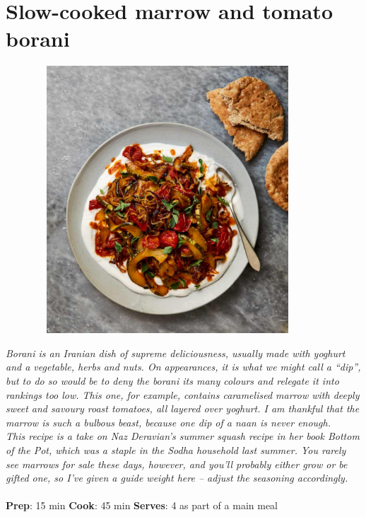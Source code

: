 \documentclass{book}
\begin{document}
\section{Slow-cooked marrow and tomato borani}
\begin{figure}
\centering\includegraphics[width=10cm,height=10cm,keepaspectratio]{Recipe_Pictures/Slow-cooked_marrow_and_tomato_borani.png}
\end{figure}
\emph{Borani is an Iranian dish of supreme deliciousness, usually made with yoghurt and a vegetable, herbs and nuts. On appearances, it is what we might call a “dip”, but to do so would be to deny the borani its many colours and relegate it into rankings too low. This one, for example, contains caramelised marrow with deeply sweet and savoury roast tomatoes, all layered over yoghurt. I am thankful that the marrow is such a bulbous beast, because one dip of a naan is never enough.\\ 
This recipe is a take on Naz Deravian’s summer squash recipe in her book Bottom of the Pot, which was a staple in the Sodha household last summer. You rarely see marrows for sale these days, however, and you’ll probably either grow or be gifted one, so I’ve given a guide weight here – adjust the seasoning accordingly.}\\\\ 
\textbf{Prep}: 15 min
\textbf{Cook}: 45 min
\textbf{Serves}: 4 as part of a main meal
\end{document}
